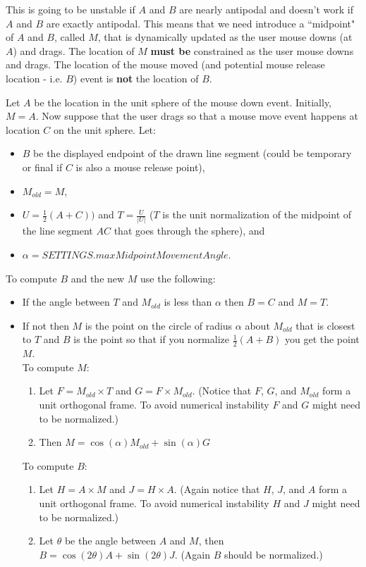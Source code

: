 \documentclass{article}
\begin{document}
This is going to be unstable if $A$ and $B$ are nearly antipodal and doesn't work if $A$ and $B$ 
are exactly antipodal.  This means that we need introduce a ``midpoint" of $A$ and $B$, called $M$,
that is dynamically updated as the user mouse downs (at $A$) and drags. The location of  $M$ \textbf{must be} constrained as the user mouse downs and drags. The location of the mouse moved (and potential mouse release location - i.e. $B$) event is \textbf{not} the location of $B$.

Let $A$ be the location in the unit sphere of the mouse down event. Initially, $M = A$. Now suppose that the user drags so that a mouse move event happens at location $C$ on the unit sphere. Let:
\begin{itemize} 
    \item $B$ be the displayed endpoint of the drawn line segment (could be temporary or final if $C$ is also a mouse release point), 
    \item $M_{old} = M$, 
    \item $U = \frac{1}{2}(A+C))$ and $T= \frac{U}{|U|}$ ($T$ is the unit normalization of the midpoint of the line segment $AC$ that goes through the sphere), and
    \item  $\alpha = SETTINGS.maxMidpointMovementAngle$. 
\end{itemize}
To compute $B$ and the new $M$ use the following:
\begin{itemize}
    \item If the angle between $T$ and $M_{old}$ is less than $\alpha$ then $B = C$ and $M = T$.
    \item If not then $M$ is the point on the circle of radius $\alpha$ about $M_{old}$ that is closest to $T$ and $B$ is the point so that if you normalize $\frac{1}{2} (A+B)$ you get the point $M$.\\ To compute $M$:
    \begin{enumerate}
        \item Let $F = M_{old} \times T$ and $G= F \times M_{old}$. (Notice that $F$, $G$, and $M_{old}$ form a unit orthogonal frame. To avoid numerical instability $F$ and $G$ might need to be normalized.)
        \item Then $M = \cos(\alpha)M_{old} + \sin(\alpha)G$
      \end{enumerate}
      To compute $B$:
      \begin{enumerate}
          \item Let $H= A \times M$ and $J = H \times A$. (Again notice that $H$, $J$, and $A$ form a unit orthogonal frame. To avoid numerical instability $H$ and $J$ might need to be normalized.)
          \item Let $\theta$ be the angle between $A$ and $M$, then $B = \cos(2\theta)A + \sin(2\theta)J$. (Again $B$ should be normalized.)
      \end{enumerate}
  \end{itemize}
\end{document}
